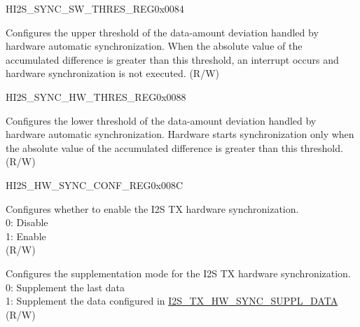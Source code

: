 \begin{register}{H}{I2S\_SYNC\_SW\_THRES\_REG}{0x0084}\label{regdesc:I2SSYNCSWTHRESREG}
%
%
\regnewline%
\begin{regdesc}\begin{reglist}
\label{fielddesc:I2STXCNTDIFFSWTHRES}\item [I2S\_TX\_CNT\_DIFF\_SW\_THRES] Configures the upper threshold of the data-amount deviation handled by hardware automatic synchronization. When the absolute value of the accumulated difference is greater than this threshold, an interrupt occurs and hardware synchronization is not executed. (R/W)
\end{reglist}\end{regdesc}
\end{register}


\begin{register}{H}{I2S\_SYNC\_HW\_THRES\_REG}{0x0088}\label{regdesc:I2SSYNCHWTHRESREG}
%
%
\regnewline%
\begin{regdesc}\begin{reglist}
\label{fielddesc:I2STXCNTDIFFHWTHRES}\item [I2S\_TX\_CNT\_DIFF\_HW\_THRES] Configures the lower threshold of the data-amount deviation handled by hardware automatic synchronization. Hardware starts synchronization only when the absolute value of the accumulated difference is greater than this threshold. (R/W)
\end{reglist}\end{regdesc}
\end{register}


\begin{register}{H}{I2S\_HW\_SYNC\_CONF\_REG}{0x008C}\label{regdesc:I2SHWSYNCCONFREG}
%
%
%
\regnewline%
\begin{regdesc}\begin{reglist}
\label{fielddesc:I2STXHWSYNCEN}\item [I2S\_TX\_HW\_SYNC\_EN] Configures whether to enable the I2S TX hardware synchronization. \\
0: Disable \\
1: Enable \\
(R/W)
\label{fielddesc:I2STXHWSYNCSUPPLMODE}\item [I2S\_TX\_HW\_SYNC\_SUPPL\_MODE] Configures the supplementation mode for the I2S TX hardware synchronization. \\
0: Supplement the last data \\
1: Supplement the data configured in \hyperref[fielddesc:I2STXHWSYNCSUPPLDATA]{I2S\_TX\_HW\_SYNC\_SUPPL\_DATA}\\
(R/W)
\end{reglist}\end{regdesc}
\end{register}



